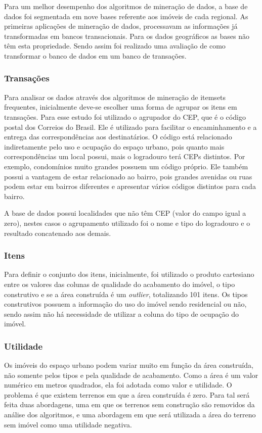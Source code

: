 \documentclass[12pt]{article}
\begin{document}
Para um melhor desempenho dos algoritmos de mineração de dados, a base de dados foi segmentada em nove bases referente aos imóveis de cada regional. As primeiras aplicações de mineração de dados, processavam as informações já transformadas em bancos transacionais. Para os dados geográficos as bases não têm esta propriedade. Sendo assim foi realizado uma avaliação de como transformar o banco de dados em um banco de transações.

\subsubsection{Transações}
Para analisar os dados através dos algoritmos de mineração de itemsets frequentes, inicialmente deve-se escolher uma forma de agrupar os itens em transações. Para esse estudo foi utilizado o agrupador do CEP, que é o código postal dos Correios do Brasil. Ele é utilizado para facilitar o encaminhamento e a entrega das correspondências aos destinatários. O código está relacionado indiretamente pelo uso e ocupação do espaço urbano, pois quanto mais correspondências um local possui, mais o logradouro terá CEPs distintos. Por exemplo, condomínios muito grandes possuem um código próprio. Ele também possui a vantagem de estar relacionado ao bairro, pois grandes avenidas ou ruas podem estar em bairros diferentes e apresentar vários códigos distintos para cada bairro. 

A base de dados possui localidades que não têm CEP (valor do campo igual a zero), nestes casos o agrupamento utilizado foi o nome e tipo do logradouro e o resultado concatenado aos demais.
 
 \subsubsection{Itens}
 Para definir o conjunto dos itens, inicialmente, foi utilizado o produto cartesiano entre os valores das colunas de qualidade do acabamento do imóvel, o tipo construtivo e se a área construída é um \textit{outlier}, totalizando 101 itens. Os tipos construtivos possuem a informação do uso do imóvel sendo residencial ou não, sendo assim não há necessidade de utilizar a coluna do tipo de ocupação do imóvel.

 \subsubsection{Utilidade}
 Os imóveis do espaço urbano podem variar muito em função da área construída, não somente pelos tipos e pela qualidade de acabamento. Como a área é um valor numérico em metros quadrados, ela foi adotada como valor e utilidade. O problema é que existem terrenos em que a área construída é zero. Para tal será feita duas abordagens, uma em que os terrenos sem construção são removidos da análise dos algoritmos, e uma abordagem em que será utilizada a área do terreno sem imóvel como uma utilidade negativa.%
\end{document}
